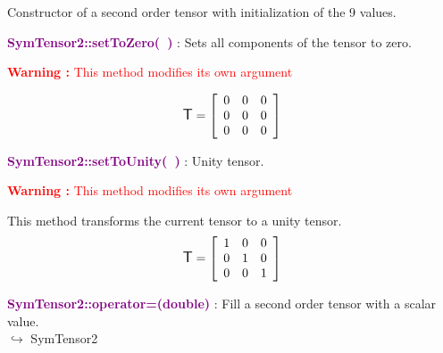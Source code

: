 Constructor of a second order tensor with initialization of the 9 values.

\textcolor{purple}{\textbf{SymTensor2::setToZero(~)}}\label{SymTensor2::setToZero()} : Sets all components of the tensor to zero.

\hspace*{10mm}\textcolor{red}{\textbf{Warning :} This method modifies its own argument}

\begin{equation*}
\mbox{\large\ensuremath{\mathsf{T}}}=\left[\begin{array}{ccc}
0&0&0\\
0&0&0\\
0&0&0
\end{array}\right]
\end{equation*}

\textcolor{purple}{\textbf{SymTensor2::setToUnity(~)}}\label{SymTensor2::setToUnity()} : Unity tensor.

\hspace*{10mm}\textcolor{red}{\textbf{Warning :} This method modifies its own argument}

This method transforms the current tensor to a unity tensor.
\begin{equation*}
\mbox{\large\ensuremath{\mathsf{T}}}=\left[\begin{array}{ccc}
1&0&0\\
0&1&0\\
0&0&1
\end{array}\right]
\end{equation*}

\textcolor{purple}{\textbf{SymTensor2::operator=(double)}}\label{SymTensor2::operator=(double)} : Fill a second order tensor with a scalar value.\\ \hspace*{5mm}$\hookrightarrow$ SymTensor2

